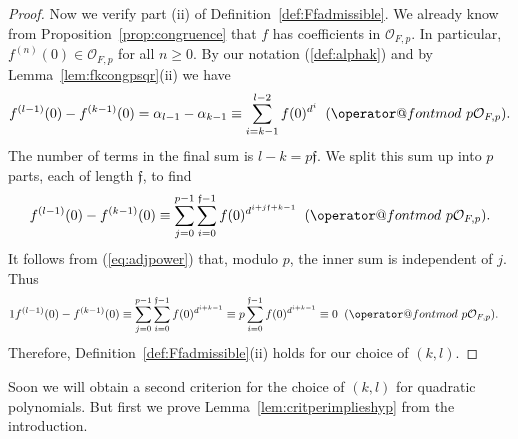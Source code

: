 \documentclass[12pt,oneside,a4]{amsart}
\makeatletter
\newcommand{\cO}{\mathcal{O}}
\numberwithin{maincounter}{section}
\numberwithin{equation}{section}
\def\imod#1{\allowbreak\mkern10mu({\operator@font mod}\,\,#1)}
\makeatother
\begin{document}
\begin{proof}
  Now we verify part (ii) of Definition~\ref{def:Ffadmissible}.
  We already know from Proposition~\ref{prop:congruence}
  that $f$ has coefficients in
  $\cO_{F,p}$. In particular, $f^{(n)}(0)\in \cO_{F,p}$ for all $n\ge 0$.  
  By our notation (\ref{def:alphak}) and by Lemma~\ref{lem:fkcongpsqr}(ii) we have
  \begin{equation*}
    f^{(l-1)}(0) - f^{(k-1)}(0) =     \alpha_{l-1}-\alpha_{k-1} 
    \equiv \sum_{i=k-1}^{l-2} f(0)^{d^i} \imod{ p\cO_{F,p}}.
  \end{equation*}
  The number of terms in the final sum is $l-k = p\mathfrak f$. 
  We split this sum up into $p$ parts, each of length $\mathfrak f$,
  to find
  \begin{equation*}
    f^{(l-1)}(0) - f^{(k-1)}(0) \equiv \sum_{j=0}^{p-1}
    \sum_{i=0}^{\mathfrak f-1} f(0)^{d^{i + j\mathfrak f + k-1}}
    \imod{p\cO_{F,p}}.
  \end{equation*}
  It follows from  (\ref{eq:adjpower}) that, modulo $p$, the inner sum is
  independent of $j$. Thus
  \begin{alignat*}1
    f^{(l-1)}(0) - f^{(k-1)}(0) &\equiv \sum_{j=0}^{p-1}
                                \sum_{i=0}^{\mathfrak f-1} f(0)^{d^{i+k-1}}
                              \equiv p \sum_{i=0}^{\mathfrak f-1} f(0)^{d^{i+k-1}}
                              \equiv 0\imod{p\cO_{F,p}}.
  \end{alignat*}
  Therefore, Definition~\ref{def:Ffadmissible}(ii) 
  holds for our choice of $(k,l)$.
\end{proof}

Soon we will obtain a second criterion for the choice of $(k,l)$ for
quadratic polynomials. But first
we prove Lemma~\ref{lem:critperimplieshyp} from the
introduction.
\end{document}
